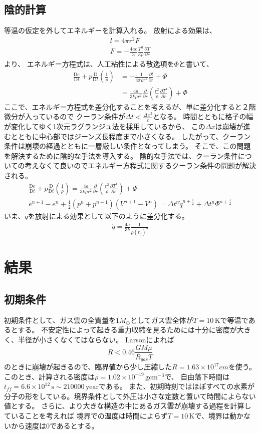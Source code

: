 \documentclass[a4j, dvipdfmx]{jsarticle}
\newcommand{\pder}[2][]{\frac{\partial#1}{\partial#2}}
\newcommand{\Dder}[2][]{\frac{\mathrm{D}#1}{\mathrm{D}#2}}
\newcommand{\half}{\frac{1}{2}}
\newcommand{\beq}{\begin{equation}}
\newcommand{\eeq}{\end{equation}}
\begin{document}
\subsection{陰的計算}
等温の仮定を外してエネルギーを計算入れる。
放射による効果は、
\begin{align}
    l = 4\pi r^2 F\\
    F = - \frac{4ac}{3} \frac{T^3}{\kappa \rho}\pder[T]{r}
\end{align}
より、
エネルギー方程式は、人工粘性による散逸項を$\Phi$と書いて、
\begin{align}
    \Dder[e]{t} + p \Dder[]{t}\left(\frac{1}{\rho}\right) &= - \frac{1}{4\pi\rho r^2}\pder[l]{r} + \Phi\\
                                                          &= 
                                                          \frac{4a}{3k\rho r^2}\pder[]{r}\left(\frac{r^2}{\rho} \pder[T^4]{r} \right) + \Phi
\end{align}    
ここで、エネルギー方程式を差分化することを考えるが、単に差分化すると２階微分が入っているので
クーラン条件が$\Delta t < \frac{\Delta x^2}{c}$となる。
時間とともに格子の幅が変化してゆく1次元ラグランジュ法を採用しているから、
この$\Delta x$は崩壊が進むとともに中心部ではジーンズ長程度まで小さくなる。
したがって、クーラン条件は崩壊の経過とともに一層厳しい条件となってしまう。
そこで、この問題を解決するために陰的な手法を導入する。
陰的な手法では、クーラン条件についての考えなくて良いのでエネルギー方程式に関するクーラン条件の問題が解決される。
\begin{align}
    \Dder[e]{t} + p \Dder[]{t}\left(\frac{1}{\rho}\right) 
= \frac{4a}{3k\rho r^2}\pder[]{r}\left(\frac{r^2}{\rho} \pder[T^4]{r} \right) + \Phi\\
e^{n+1} - e^{n} + \half (p^n + p^{n+1})(V^{n+1} - V^n) = \Delta t^n \dot{q}^{n+\half}+\Delta t^n \Phi^{n+\half}
\end{align}    
いま、$\dot{q}$を放射による効果として以下のように差分化する。
\begin{align}
    \dot{q} = \frac{4a}{3k}\frac{1}{\rho (r_j)^2}
\end{align}


\section{結果}
\subsection{初期条件}
初期条件として、ガス雲の全質量を$1M_\odot$としてガス雲全体が$T=10\,\mathrm{K}$で等温であるとする。
不安定性によって起きる重力収縮を見るためには十分に密度が大きく、半径が小さくなくてはならない。
Larson\cite{Larson}によれば
\beq
R < 0.46 \frac{GM\mu}{R_{gas}T}
\eeq
のときに崩壊が起きるので、臨界値から少し圧縮した$R = 1.63 \times 10^{17}cm$を使う。
このとき、計算される密度は$\rho = 1.02 \times 10^{-19}\,\mathrm{gcm^{-3}}$で、
自由落下時間は$t_{ff} = 6.6 \times 10^{12} \,\mathrm{s} \sim 210000 \,\mathrm{year}$である。
また、初期時刻ではほぼすべての水素が分子の形をしている。境界条件として外圧は小さな定数と置いて時間によらない値とする。
さらに、より大きな構造の中にあるガス雲が崩壊する過程を計算していることを考えれば
境界での温度は時間によらず$T=10\,\mathrm{K}$で、境界は動かないから速度は$0$であるとする。
\end{document}
